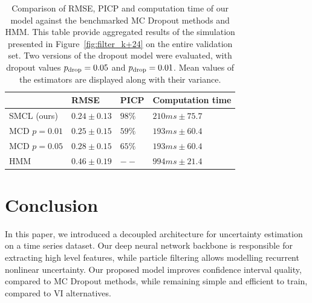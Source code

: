 \documentclass[conference]{IEEEtran}
\begin{document}
\begin{table}[htpb]
	\centering
	\caption{Comparison of RMSE, PICP and computation time of our model against the benchmarked MC Dropout methods and HMM.
		This table provide aggregated results of the simulation presented in Figure~\ref{fig:filter_k+24} on the entire validation set.
		Two versions of the dropout model were evaluated, with dropout values $p_\textnormal{drop}=0.05$ and $p_\textnormal{drop}=0.01$.
		Mean values of the estimators are displayed along with their variance.}
	\label{tab:ci_comparison}
	\begin{tabular}{llll}
		\toprule
		             & RMSE            & PICP   & Computation time  \\
		\toprule
		SMCL (ours)  & $0.24 \pm 0.13$ & $98\%$ & $210 ms \pm 75.7$ \\
		MCD $p=0.01$ & $0.25 \pm 0.15$ & $59\%$ & $193 ms \pm 60.4$ \\
		MCD $p=0.05$ & $0.28 \pm 0.15$ & $65\%$ & $193 ms \pm 60.4$ \\
		HMM          & $0.46 \pm 0.19$ & $--$   & $994 ms \pm 21.4$ \\
		\bottomrule
	\end{tabular}
\end{table}


\section{Conclusion}%
\label{sec:conclusion}

In this paper, we introduced a decoupled architecture for uncertainty estimation on a time series dataset.
Our deep neural network backbone is responsible for extracting high level features, while particle filtering allows modelling recurrent nonlinear uncertainty.
Our proposed model improves confidence interval quality, compared to MC Dropout methods, while remaining simple and efficient to train, compared to VI alternatives.
\end{document}
